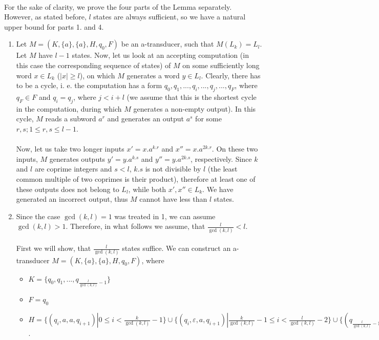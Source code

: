 \paragraph{}
\dokaz For the sake of clarity, we prove the four parts of the Lemma separately. However, as stated before, $l$ states are always sufficient, so we have a natural upper bound for parts 1. and 4.
\begin{enumerate}
\item Let $M = (K, \{a\}, \{a\}, H, q_0, F)$ be an a-transducer, such that $M(L_k) = L_l$. Let $M$ have $l-1$ states. Now, let us look at an accepting computation (in this case the corresponding sequence of states) of $M$ on some sufficiently long word $x \in L_k$ ($|x| \geq l$), on which $M$ generates a word $y \in L_l$. Clearly, there has to be a cycle, i. e. the computation has a form $q_0, q_1, ..., q_i, ..., q_j, ..., q_F$, where $q_F \in F$ and $q_i = q_j$, where $j < i + l$ (we assume that this is the shortest cycle in the computation, during which $M$ generates a non-empty output). In this cycle, $M$ reads a subword $a^r$ and generates an output $a^s$ for some $r,s; 1 \leq r,s \leq l-1$.

\paragraph{}
Now, let us take two longer inputs $x' = x.a^{k.r}$ and $x'' = x.a^{2k.r}$. On these two inputs, $M$ generates outputs $y' = y.a^{k.s}$ and $y'' = y.a^{2k.s}$, respectively. Since $k$ and $l$ are coprime integers and $s < l$, $k.s$ is not divisible by $l$ (the least common multiple of two coprimes is their product), therefore at least one of these outputs does not belong to $L_l$, while both $x', x'' \in L_k$. We have generated an incorrect output, thus $M$ cannot have less than $l$ states.

\item Since the case $\gcd(k,l)=1$ was treated in 1, we can assume $\gcd(k,l) > 1$. Therefore, in what follows we assume, that $\frac{l}{\gcd(k,l)} < l$.

\paragraph{}
First we will show, that $\frac{l}{\gcd(k,l)}$ states suffice. We can construct an a-transducer $M = (K, \{ a\}, \{ a\}, H, q_0, F)$, where
\begin{itemize}
\item $K = \{ q_0, q_1,  ..., q_{\frac{l}{\gcd(k,l)}-1 }\}$
\item $F = q_0$%
\item $H = \{(q_i, a, a, q_{i+1})| 0 \leq i < \frac{k}{\gcd(k,l)}-1 \} \cup \{(q_i, \varepsilon, a, q_{i+1})| \frac{k}{\gcd(k,l)}-1 \leq i < \frac{l}{\gcd(k,l)}-2 \} \cup \{ (q_{\frac{l}{\gcd(k,l)}-1}, \varepsilon, a, q_0) \}$.
\end{itemize}


\end{enumerate}
